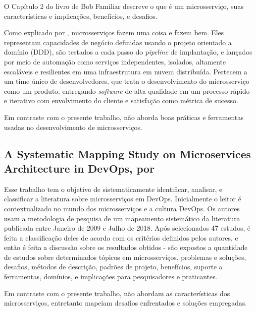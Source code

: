 O Capítulo 2 do livro de Bob Familiar descreve o que é um microsserviço, suas características e implicações, benefícios, e desafios. 

Como explicado por , microsserviços fazem uma coisa e fazem bem. Eles representam capacidades de negócio definidas usando o projeto orientado a domínio (DDD), são testados a cada passo do \emph{pipeline} de implantação, e lançados por meio de automação como serviços independentes, isolados, altamente escaláveis e resilientes em uma infraestrutura em nuvem distribuída. Pertecem a um time único de desenvolvedores, que trata o desenvolvimento do microsserviço como um produto, entregando \emph{software} de alta qualidade em um processo rápido e iterativo com envolvimento do cliente e satisfação como métrica de sucesso.

Em contraste com o presente trabalho,  não aborda boas práticas e ferramentas usadas no desenvolvimento de microsserviços.

\subsection{A Systematic Mapping Study on Microservices Architecture in DevOps, por }

Esse trabalho tem o objetivo de sistematicamente identificar, analisar, e classificar a literatura sobre microsserviços em DevOps. Inicialmente o leitor é contextualizado no mundo dos microsserviços e a cultura DevOps. Os autores usam a metodologia de pesquisa de um mapeamento sistemático da literatura publicada entre Janeiro de 2009 e Julho de 2018. Após selecionados 47 estudos, é feita a classificação deles de acordo com os critérios definidos pelos autores, e então é feita a discussão sobre os resultados obtidos - são expostos a quantidade de estudos sobre determinados tópicos em microsserviços, problemas e soluções, desafios, métodos de descrição, padrões de projeto, benefícios, suporte a ferramentas, domínios, e implicações para pesquisadores e praticantes.

Em contraste com o presente trabalho,  não abordam as características dos microsserviços, entretanto mapeiam desafios enfrentados e soluções
empregadas.


